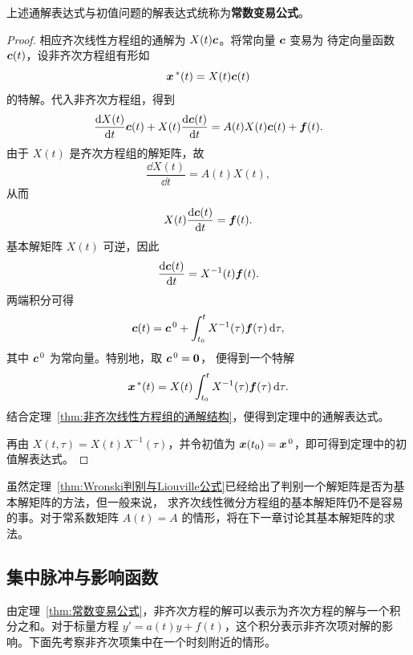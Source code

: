 上述通解表达式与初值问题的解表达式统称为\textbf{常数变易公式}。

\begin{proof}
	相应齐次线性方程组的通解为 $X(t)\boldsymbol{c}$。将常向量 $\boldsymbol{c}$ 变易为
	待定向量函数 $\boldsymbol{c}(t)$，设非齐次方程组有形如
	\[
		\boldsymbol{x}^{\,*}(t)=X(t)\boldsymbol{c}(t)
	\]
	的特解。代入非齐次方程组，得到
	\[
		\dfrac{\mathrm{d} X(t)}{\mathrm{d} t}\boldsymbol{c}(t)
		+X(t)\dfrac{\mathrm{d}\boldsymbol{c}(t)}{\mathrm{d} t}
		=A(t)X(t)\boldsymbol{c}(t)+\boldsymbol{f}(t).
	\]
	由于 $X(t)$ 是齐次方程组的解矩阵，故
	\[
		\dfrac{\dd X(t)}{\dd t}=A(t)X(t),
	\]
	从而
	\[
		X(t)\dfrac{\mathrm{d}\boldsymbol{c}(t)}{\mathrm{d} t}=\boldsymbol{f}(t).
	\]
	基本解矩阵 $X(t)$ 可逆，因此
	\[
		\dfrac{\mathrm{d}\boldsymbol{c}(t)}{\mathrm{d} t}=X^{-1}(t)\boldsymbol{f}(t).
	\]
	两端积分可得
	\[
		\boldsymbol{c}(t)
		=\boldsymbol{c}^{\,0}
		+\int_{t_0}^{t}X^{-1}(\tau)\boldsymbol{f}(\tau)\,\mathrm{d}\tau,
	\]
	其中 $\boldsymbol{c}^{\,0}$ 为常向量。特别地，取 $\boldsymbol{c}^{\,0}=\boldsymbol{0}$，
	便得到一个特解
	\[
		\boldsymbol{x}^{\,*}(t)
		=X(t)\int_{t_0}^{t}X^{-1}(\tau)\boldsymbol{f}(\tau)\,\mathrm{d}\tau.
	\]
	结合定理~\ref{thm:非齐次线性方程组的通解结构}，便得到定理中的通解表达式。

	再由 $X(t,\tau)=X(t)X^{-1}(\tau)$，并令初值为
	$\boldsymbol{x}(t_0)=\boldsymbol{x}^{\,0}$，即可得到定理中的初值解表达式。
\end{proof}

虽然定理~\ref{thm:Wronski判别与Liouville公式}已经给出了判别一个解矩阵是否为基本解矩阵的方法，但一般来说，
求齐次线性微分方程组的基本解矩阵仍不是容易的事。对于常系数矩阵
$A(t)=A$ 的情形，将在下一章讨论其基本解矩阵的求法。

\subsection*{集中脉冲与影响函数}
\label{sec:green-response}
由定理~\ref{thm:常数变易公式}，非齐次方程的解可以表示为齐次方程的解与一个积分之和。对于标量方程 $y'=a(t)y+f(t)$，这个积分表示非齐次项对解的影响。下面先考察非齐次项集中在一个时刻附近的情形。



